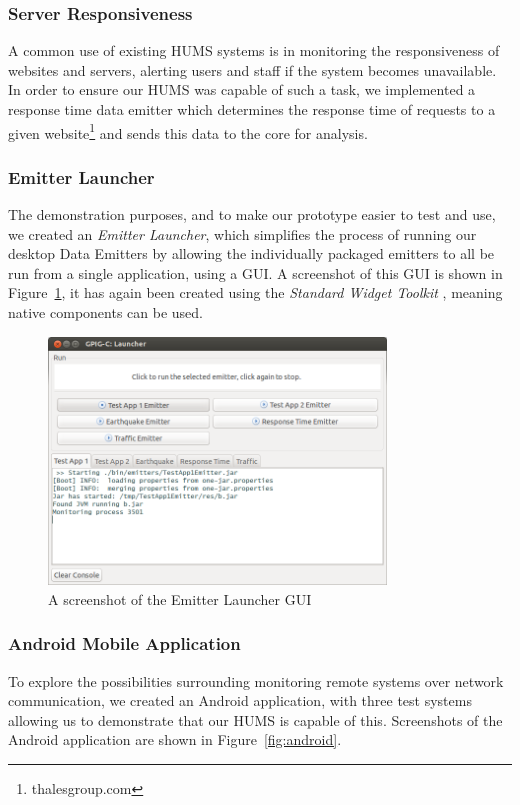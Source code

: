 \documentclass[10pt,a4paper]{article}
\begin{document}
\subsubsection{Server Responsiveness}
A common use of existing HUMS systems is in monitoring the responsiveness of websites and servers, alerting users and staff if the system becomes unavailable. In order to ensure our HUMS was capable of such a task, we implemented a response time data emitter which determines the response time of requests to a given website\footnote{thalesgroup.com} and sends this data to the core for analysis.

\subsubsection{Emitter Launcher}
The demonstration purposes, and to make our prototype easier to test and use, we created an \emph{Emitter Launcher}, which simplifies the process of running our desktop Data Emitters by allowing the individually packaged emitters to all be run from a single application, using a GUI. A screenshot of this GUI is shown in Figure~\ref{fig:launcherGUI}, it has again been created using the \emph{Standard Widget Toolkit} \cite{swt}, meaning native components can be used.
 
\begin{figure}[tbp]
\centering
\includegraphics*[width=0.8\textwidth]{images/launcherGUI.png}
\caption{A screenshot of the Emitter Launcher GUI}
\label{fig:launcherGUI}
\end{figure}

\subsubsection{Android Mobile Application}
To explore the possibilities surrounding monitoring remote systems over network communication, we created an Android application, with three test systems allowing us to demonstrate that our HUMS is capable of this. Screenshots of the Android application are shown in Figure~\ref{fig:android}.
\end{document}
